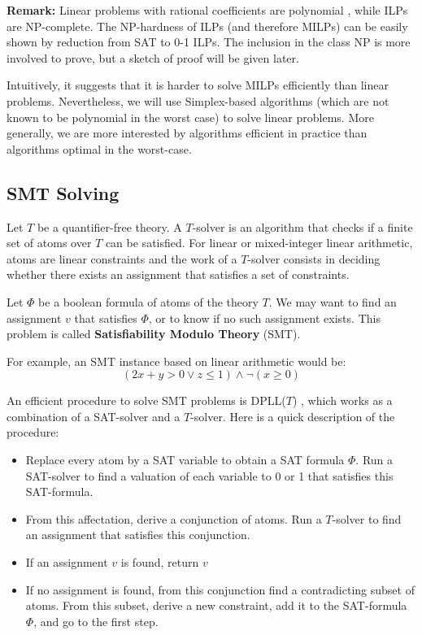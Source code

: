 \documentclass{article}
\begin{document}
\textbf{Remark:} Linear problems with rational coefficients are
polynomial \cite[Section 13, 18]{Schrijver1998}, while ILPs are NP-complete.
The NP-hardness of ILPs (and therefore MILPs)
can be easily shown by reduction from SAT to 0-1 ILPs. The
inclusion in the class NP is more involved to prove, but a sketch of proof will
be given later.

Intuitively, it suggests that it is harder to solve MILPs efficiently than
linear problems. Nevertheless, we will use Simplex-based algorithms (which are
not known to be polynomial in the worst case) to solve linear problems. More
generally, we are more interested by algorithms efficient in practice than
algorithms optimal in the worst-case.


\subsection{SMT Solving}
\label{smt}
Let $T$ be a quantifier-free theory. A $T$-solver is an algorithm that checks
if a finite set of atoms over $T$ can be satisfied. For linear or mixed-integer
linear arithmetic, atoms are linear constraints and the work of a $T$-solver
consists in deciding whether there exists an assignment
that satisfies a set of constraints.

Let $\Phi$ be a boolean formula of atoms of the theory $T$. We may want to find
an assignment $v$ that satisfies $\Phi$, or to know if no such assignment
exists. This problem is called \textbf{Satisfiability Modulo Theory} (SMT).

For example, an SMT instance based on linear arithmetic would be:
$$(2x + y > 0 \vee z \leqslant 1) \wedge \neg (x \geqslant 0)$$

An efficient procedure to solve SMT problems is DPLL($T$)
\cite[Section 3.2]{Decision2016},
which works as a combination of a SAT-solver and a $T$-solver. Here is a quick
description of the procedure:
\begin{itemize}
  \item Replace every atom by a SAT variable to obtain a SAT formula $\Phi$.
    Run a SAT-solver to find a valuation of each variable to 0 or 1 that
    satisfies this SAT-formula.
  \item From this affectation, derive a conjunction of atoms. Run a
    $T$-solver to find an assignment that satisfies this conjunction.
  \item If an assignment $v$ is found, return $v$
  \item If no assignment is found, from this conjunction find a contradicting
    subset of atoms. From this subset, derive a new constraint, add it to the
    SAT-formula $\Phi$, and go to the first step.
\end{itemize}
\end{document}
